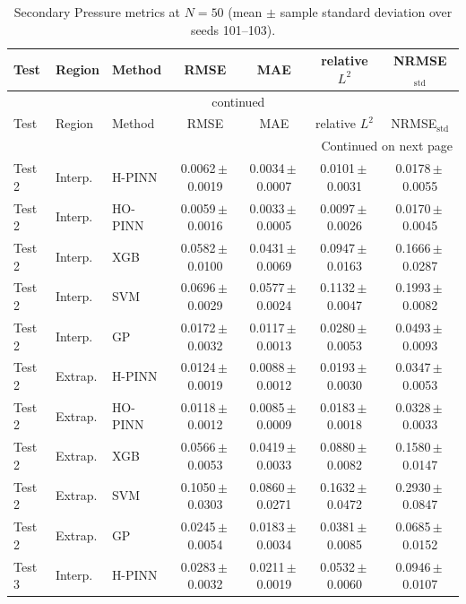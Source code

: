 \begingroup
\footnotesize
\setlength{\tabcolsep}{1.25pt}
\begin{longtable}{lllcccc}
\caption{Secondary Pressure metrics at $N=50$ (mean $\pm$ sample standard deviation over seeds 101--103).}\label{tab:appendix_pressure_metrics}\\
\toprule
Test & Region & Method & RMSE & MAE & relative $L^2$ & NRMSE$_{\mathrm{std}}$ \\
\midrule
\endfirsthead
\multicolumn{7}{c}{\tablename~\thetable{} continued} \\
\toprule
Test & Region & Method & RMSE & MAE & relative $L^2$ & NRMSE$_{\mathrm{std}}$ \\
\midrule
\endhead
\midrule
\multicolumn{7}{r}{Continued on next page} \\
\endfoot
\bottomrule
\endlastfoot
Test 2 & Interp. & H-PINN & 0.0062\,$\pm$\,0.0019 & 0.0034\,$\pm$\,0.0007 & 0.0101\,$\pm$\,0.0031 & 0.0178\,$\pm$\,0.0055 \\
Test 2 & Interp. & HO-PINN & 0.0059\,$\pm$\,0.0016 & 0.0033\,$\pm$\,0.0005 & 0.0097\,$\pm$\,0.0026 & 0.0170\,$\pm$\,0.0045 \\
Test 2 & Interp. & XGB & 0.0582\,$\pm$\,0.0100 & 0.0431\,$\pm$\,0.0069 & 0.0947\,$\pm$\,0.0163 & 0.1666\,$\pm$\,0.0287 \\
Test 2 & Interp. & SVM & 0.0696\,$\pm$\,0.0029 & 0.0577\,$\pm$\,0.0024 & 0.1132\,$\pm$\,0.0047 & 0.1993\,$\pm$\,0.0082 \\
Test 2 & Interp. & GP & 0.0172\,$\pm$\,0.0032 & 0.0117\,$\pm$\,0.0013 & 0.0280\,$\pm$\,0.0053 & 0.0493\,$\pm$\,0.0093 \\
\addlinespace[2pt]
Test 2 & Extrap. & H-PINN & 0.0124\,$\pm$\,0.0019 & 0.0088\,$\pm$\,0.0012 & 0.0193\,$\pm$\,0.0030 & 0.0347\,$\pm$\,0.0053 \\
Test 2 & Extrap. & HO-PINN & 0.0118\,$\pm$\,0.0012 & 0.0085\,$\pm$\,0.0009 & 0.0183\,$\pm$\,0.0018 & 0.0328\,$\pm$\,0.0033 \\
Test 2 & Extrap. & XGB & 0.0566\,$\pm$\,0.0053 & 0.0419\,$\pm$\,0.0033 & 0.0880\,$\pm$\,0.0082 & 0.1580\,$\pm$\,0.0147 \\
Test 2 & Extrap. & SVM & 0.1050\,$\pm$\,0.0303 & 0.0860\,$\pm$\,0.0271 & 0.1632\,$\pm$\,0.0472 & 0.2930\,$\pm$\,0.0847 \\
Test 2 & Extrap. & GP & 0.0245\,$\pm$\,0.0054 & 0.0183\,$\pm$\,0.0034 & 0.0381\,$\pm$\,0.0085 & 0.0685\,$\pm$\,0.0152 \\
\addlinespace[2pt]
Test 3 & Interp. & H-PINN & 0.0283\,$\pm$\,0.0032 & 0.0211\,$\pm$\,0.0019 & 0.0532\,$\pm$\,0.0060 & 0.0946\,$\pm$\,0.0107 \\

\end{longtable}
